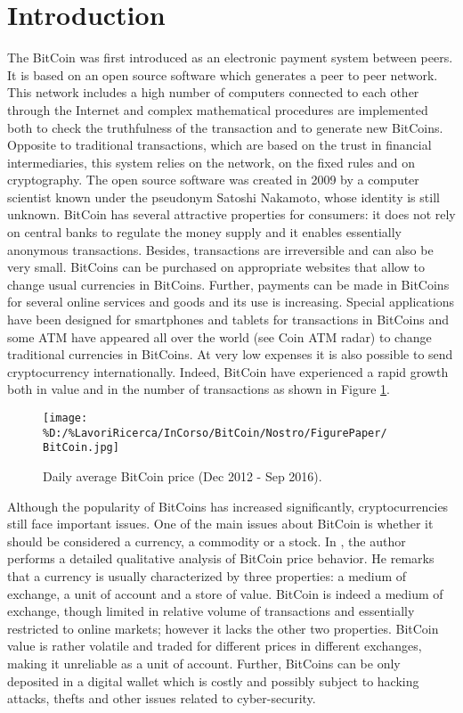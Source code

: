 \documentclass[12pt,centertags,reqno]{amsart}
\numberwithin{equation}{section} \makeatletter
\begin{document}
\section{Introduction}

The BitCoin was first introduced as an electronic payment system between peers. It is based on an open source software which generates a peer to peer network. This network includes a high number of computers connected to each other through the Internet and complex mathematical procedures are implemented both to check the truthfulness of the transaction and to generate new BitCoins. Opposite to traditional transactions, which are based on the trust in financial intermediaries, this system relies on the network, on the fixed rules and on cryptography. The open source software was created in 2009 by a computer scientist known under the pseudonym Satoshi Nakamoto, whose identity is still unknown. BitCoin has several attractive properties for consumers: it does not rely on central banks to regulate the money supply and it enables essentially anonymous transactions. Besides, transactions are irreversible and can also be very small. BitCoins can be purchased on appropriate websites that allow to change usual currencies in BitCoins. Further, payments can be made in BitCoins for several online services and goods and its use is increasing. Special applications have been designed for smartphones and tablets for transactions in BitCoins and some ATM have appeared all over the world (see Coin ATM radar) to change traditional currencies in BitCoins. At very low expenses it is also possible to send cryptocurrency internationally. 
Indeed, BitCoin have experienced a rapid growth both in value and in the number of transactions as shown in Figure \ref{BitCoin}.
\begin{figure}[htbp]
\texttt{[image: \%D:/\%LavoriRicerca/InCorso/BitCoin/Nostro/FigurePaper/
BitCoin.jpg]}
\caption{Daily average BitCoin price (Dec 2012 - Sep 2016).} \label{BitCoin}
\end{figure}
Although the popularity of BitCoins has increased significantly, cryptocurrencies still face important issues. One of the main issues about BitCoin is whether it should be considered a currency, a commodity or a stock. In \citet{Yermack}, the author performs a detailed qualitative analysis of BitCoin price behavior. He remarks that a currency is usually characterized by three properties: a medium of exchange, a unit of account and a store of value. BitCoin is indeed a medium of exchange, though limited in relative volume of transactions and essentially restricted to online markets; however it lacks the other two properties. BitCoin value is rather volatile and traded for different prices in different exchanges, making it unreliable as a unit of account.  Further, BitCoins can be only deposited in a digital wallet which is costly and possibly subject to hacking attacks, thefts and other issues related to cyber-security.
\end{document}
